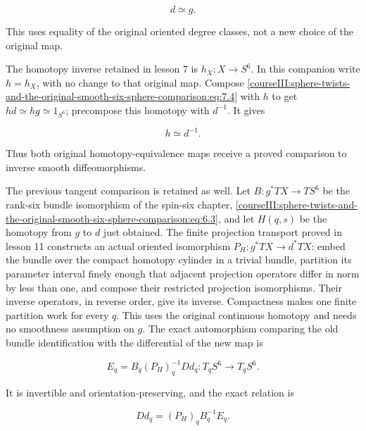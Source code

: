 \begin{equation}
d\simeq g .
 \label{courseIII:sphere-twists-and-the-original-smooth-six-sphere-comparison:eq:7.4}
\end{equation}

This uses equality of the original oriented degree classes, not a new choice of the original map.

The homotopy inverse retained in lesson 7 is \(h_X:X\to S^6\). In this companion write \(h=h_X\), with no change to that original map. Compose \eqref{courseIII:sphere-twists-and-the-original-smooth-six-sphere-comparison:eq:7.4} with \(h\) to get \(hd\simeq hg\simeq1_{S^6}\); precompose this homotopy with \(d^{-1}\). It gives

\begin{equation}
h\simeq d^{-1}.
 \label{courseIII:sphere-twists-and-the-original-smooth-six-sphere-comparison:eq:7.5}
\end{equation}

Thus both original homotopy-equivalence maps receive a proved comparison to inverse smooth diffeomorphisms.

The previous tangent comparison is retained as well. Let \(B:g^*TX\to TS^6\) be the rank-six bundle isomorphism of the spin-six chapter, \eqref{courseIII:sphere-twists-and-the-original-smooth-six-sphere-comparison:eq:6.3}, and let \(H(q,s)\) be the homotopy from \(g\) to \(d\) just obtained. The finite projection transport proved in lesson 11 constructs an actual oriented isomorphism \(P_H:g^*TX\to d^*TX\): embed the bundle over the compact homotopy cylinder in a trivial bundle, partition its parameter interval finely enough that adjacent projection operators differ in norm by less than one, and compose their restricted projection isomorphisms. Their inverse operators, in reverse order, give its inverse. Compactness makes one finite partition work for every \(q\). This uses the original continuous homotopy and needs no smoothness assumption on \(g\). The exact automorphism comparing the old bundle identification with the differential of the new map is

\begin{equation}
E_q=B_q(P_H)_q^{-1}Dd_q:T_qS^6\longrightarrow T_qS^6 .
 \label{courseIII:sphere-twists-and-the-original-smooth-six-sphere-comparison:eq:7.6}
\end{equation}

It is invertible and orientation-preserving, and the exact relation is

\begin{equation}
Dd_q=(P_H)_qB_q^{-1}E_q .
 \label{courseIII:sphere-twists-and-the-original-smooth-six-sphere-comparison:eq:7.7}
\end{equation}

